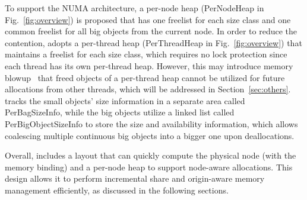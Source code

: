 To support the NUMA architecture, a per-node heap (PerNodeHeap in Fig.~\ref{fig:overview}) is proposed that has one freelist for each size class and one common freelist for all big objects from the current node. 
In order to reduce the contention, \NM{} adopts a per-thread heap (PerThreadHeap in Fig.~\ref{fig:overview}) that maintains a freelist for each size class, which requires no lock protection since each thread has its own per-thread heap. However, this may introduce memory blowup~\cite{Hoard} that freed objects of a per-thread heap cannot be utilized for future allocations from other threads, which will be addressed in Section~\ref{sec:others}. 
\NM{} tracks the small objects' size information in a separate area called PerBagSizeInfo, while the big objects utilize a linked list called PerBigObjectSizeInfo to store the size and availability information, which allows coalescing multiple continuous big objects into a bigger one upon deallocations.



Overall, \NM{} includes a layout that can quickly compute the physical node (with the memory binding) and a per-node heap to support node-aware allocations. This design allows it to perform incremental share and origin-aware memory management efficiently, as discussed in the following sections.

